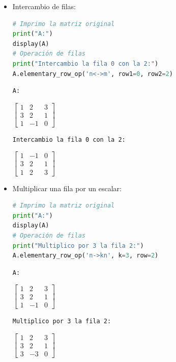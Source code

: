 \documentclass[a4,11pt]{aleph-notas}
\begin{document}
\begin{itemize}
\item
    Intercambio de filas:
\begin{pycodigo}
    \begin{ipynbcodigo}\begin{lstlisting}[language=Python]
# Imprimo la matriz original
print("A:")
display(A)
# Operación de filas
print("Intercambio la fila 0 con la 2:")
A.elementary_row_op('n<->m', row1=0, row2=2)
    \end{lstlisting}\end{ipynbcodigo}
    \begin{ipynbsalida}
    \begin{Verbatim}
A:
    \end{Verbatim}
    $\displaystyle \left[\begin{matrix}1 & 2 & 3\\3 & 2 & 1\\1 & -1 & 0\end{matrix}\right]$
    \begin{Verbatim}
Intercambio la fila 0 con la 2:
    \end{Verbatim}
    $\displaystyle \left[\begin{matrix}1 & -1 & 0\\3 & 2 & 1\\1 & 2 & 3\end{matrix}\right]$
    \end{ipynbsalida}
\end{pycodigo}

\item
    Multiplicar una fila por un escalar:
\begin{pycodigo}
    \begin{ipynbcodigo}\begin{lstlisting}[language=Python]
# Imprimo la matriz original
print("A:")
display(A)
# Operación de filas
print("Multiplico por 3 la fila 2:")
A.elementary_row_op('n->kn', k=3, row=2)
    \end{lstlisting}\end{ipynbcodigo}
    \begin{ipynbsalida}
    \begin{Verbatim}
A:
    \end{Verbatim}
    $\displaystyle \left[\begin{matrix}1 & 2 & 3\\3 & 2 & 1\\1 & -1 & 0\end{matrix}\right]$
    \begin{Verbatim}
Multiplico por 3 la fila 2:
    \end{Verbatim}
    $\displaystyle \left[\begin{matrix}1 & 2 & 3\\3 & 2 & 1\\3 & -3 & 0\end{matrix}\right]$
    \end{ipynbsalida}
\end{pycodigo}


\end{itemize}
\end{document}

